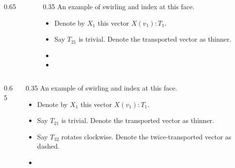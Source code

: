 \begin{frame}
\begin{columns}
\begin{column}{0.65\textwidth}
\vspace{12pt}
\begingroup
{}

\endgroup
\end{column}
\begin{column}{0.35\textwidth}
An example of \alert{swirling} and \alert{index} at this face.
\begin{itemize}
\item<1-> Denote by \( X_1 \) this vector \( X(v_1):T_1 \).
\item<1-> Say \( T_{21} \) is trivial. Denote the transported vector as thinner.
\item<1-> 
\item<1-> 
\end{itemize}
\end{column}
\end{columns}
\end{frame}

\begin{frame}
\begin{columns}
\begin{column}{0.65\textwidth}
\vspace{12pt}
\begingroup
{}

\endgroup
\end{column}
\begin{column}{0.35\textwidth}
An example of \alert{swirling} and \alert{index} at this face.
\begin{itemize}
\item<1-> Denote by \( X_1 \) this vector \( X(v_1):T_1 \).
\item<1-> Say \( T_{21} \) is trivial. Denote the transported vector as thinner.
\item<1-> Say \( T_{32} \) rotates clockwise. Denote the twice-transported vector as dashed.
\item<1-> 
\end{itemize}
\end{column}
\end{columns}
\end{frame}

